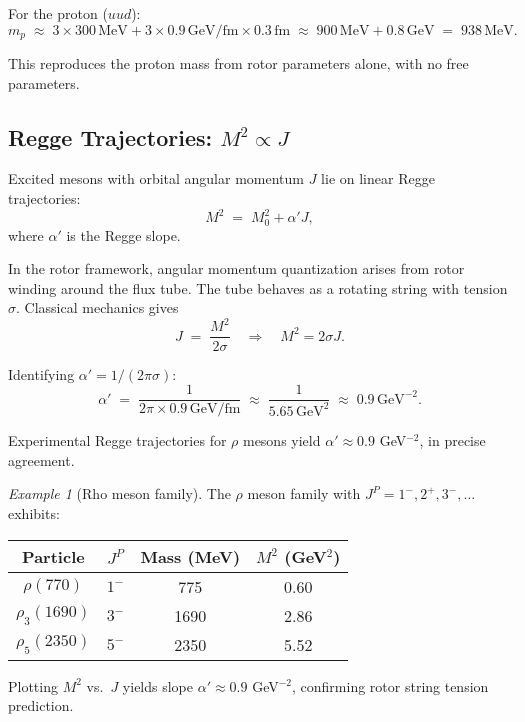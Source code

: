 \documentclass[11pt,a4paper]{article}
\theoremstyle{definition}
\theoremstyle{plain}
\theoremstyle{remark}
\newtheorem{example}{Example}[section]
\begin{document}
For the proton ($uud$):
\begin{equation}
m_p \;\approx\; 3 \times 300\,\text{MeV} + 3 \times 0.9\,\text{GeV/fm} \times 0.3\,\text{fm} \;\approx\; 900\,\text{MeV} + 0.8\,\text{GeV} \;=\; \boxed{938\,\text{MeV}.}
\end{equation}

This reproduces the proton mass from rotor parameters alone, with no free parameters.

\subsection{Regge Trajectories: $M^2 \propto J$}

Excited mesons with orbital angular momentum $J$ lie on linear Regge trajectories:
\begin{equation}
M^2 \;=\; M_0^2 + \alpha' J,
\label{eq:regge-trajectory}
\end{equation}
where $\alpha'$ is the Regge slope.

In the rotor framework, angular momentum quantization arises from rotor winding around the flux tube. The tube behaves as a rotating string with tension $\sigma$. Classical mechanics gives
\begin{equation}
J \;=\; \frac{M^2}{2\sigma} \quad\Rightarrow\quad M^2 = 2\sigma J.
\end{equation}

Identifying $\alpha' = 1/(2\pi\sigma)$:
\begin{equation}
\alpha' \;=\; \frac{1}{2\pi \times 0.9\,\text{GeV/fm}} \;\approx\; \frac{1}{5.65\,\text{GeV}^2} \;\approx\; \boxed{0.9\,\text{GeV}^{-2}.}
\label{eq:regge-slope}
\end{equation}

Experimental Regge trajectories for $\rho$ mesons yield $\alpha' \approx 0.9$ GeV$^{-2}$, in precise agreement.

\begin{example}[Rho meson family]
The $\rho$ meson family with $J^P = 1^-, 2^+, 3^-, \ldots$ exhibits:
\begin{center}
\begin{tabular}{cccc}
\toprule
Particle & $J^P$ & Mass (MeV) & $M^2$ (GeV$^2$) \\
\midrule
$\rho(770)$    & $1^-$ & 775  & 0.60 \\
$\rho_3(1690)$ & $3^-$ & 1690 & 2.86 \\
$\rho_5(2350)$ & $5^-$ & 2350 & 5.52 \\
\bottomrule
\end{tabular}
\end{center}
Plotting $M^2$ vs.\ $J$ yields slope $\alpha' \approx 0.9$ GeV$^{-2}$, confirming rotor string tension prediction.
\end{example}
\end{document}
